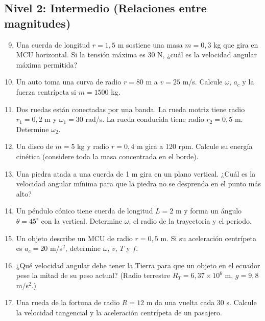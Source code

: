 \documentclass[12pt]{article}
\begin{document}
\subsection*{Nivel 2: Intermedio (Relaciones entre magnitudes)}
\begin{enumerate}
  \setcounter{enumi}{8}
  \item Una cuerda de longitud \(r = 1{,}5\) m sostiene una masa \(m = 0{,}3\) kg que gira en MCU horizontal. Si la tensión máxima es 30 N, ¿cuál es la velocidad angular máxima permitida?
  \item Un auto toma una curva de radio \(r = 80\) m a \(v = 25\) m/s. Calcule \(\omega\), \(a_c\) y la fuerza centrípeta si \(m = 1500\) kg.
  \item Dos ruedas están conectadas por una banda. La rueda motriz tiene radio \(r_1 = 0{,}2\) m y \(\omega_1 = 30\) rad/s. La rueda conducida tiene radio \(r_2 = 0{,}5\) m. Determine \(\omega_2\).
  \item Un disco de \(m = 5\) kg y radio \(r = 0{,}4\) m gira a 120 rpm. Calcule su energía cinética (considere toda la masa concentrada en el borde).
  \item Una piedra atada a una cuerda de 1 m gira en un plano vertical. ¿Cuál es la velocidad angular mínima para que la piedra no se desprenda en el punto más alto?
  \item Un péndulo cónico tiene cuerda de longitud \(L = 2\) m y forma un ángulo \(\theta = 45^\circ\) con la vertical. Determine \(\omega\), el radio de la trayectoria y el periodo.
  \item Un objeto describe un MCU de radio \(r = 0{,}5\) m. Si su aceleración centrípeta es \(a_c = 20\) m/s\(^2\), determine \(\omega\), \(v\), \(T\) y \(f\).
  \item ¿Qué velocidad angular debe tener la Tierra para que un objeto en el ecuador pese la mitad de su peso actual? (Radio terrestre \(R_T = 6{,}37 \times 10^6\) m, \(g = 9{,}8\) m/s\(^2\).)
  \item Una rueda de la fortuna de radio \(R = 12\) m da una vuelta cada 30 s. Calcule la velocidad tangencial y la aceleración centrípeta de un pasajero.
\end{enumerate}
\end{document}
